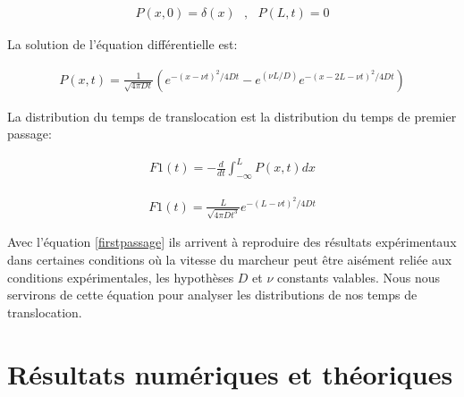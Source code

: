 \begin{eqnarray}
 P(x,0) =   \delta(x)\text{  }, \text{  } P(L,t)=0
\label{condlim}
\end{eqnarray}

La solution de l'équation différentielle est:

\begin{eqnarray}
 P(x,t) = \frac{1}{\sqrt{4\pi D t}} \left(e^{-\left(x-\nu t\right)^{2}/4Dt} -e^{(\nu L/D)}e^{-\left(x-2L-\nu t\right)^{2}/4Dt} \right)
\label{equfokkerplanksol}
\end{eqnarray}

La distribution du temps de translocation est la distribution du temps de premier passage:

\begin{eqnarray}
 F1(t) = -\frac{d}{dt}\int_{-\infty}^L  P(x,t) dx
\label{firstpassageint}
\end{eqnarray}

\begin{eqnarray}
 F1(t) = \frac{L}{\sqrt{4\pi D t^3}} e^{-\left(L-\nu t\right)^{2}/4Dt}
\label{firstpassage}
\end{eqnarray}

Avec l'équation \ref{firstpassage} ils arrivent à reproduire des résultats expérimentaux dans certaines conditions où la vitesse du marcheur peut être aisément reliée aux conditions expérimentales, les hypothèses $D$ et $\nu$ constants valables. Nous nous servirons de cette équation pour analyser les distributions de nos temps de translocation.





\section{Résultats numériques et théoriques}

